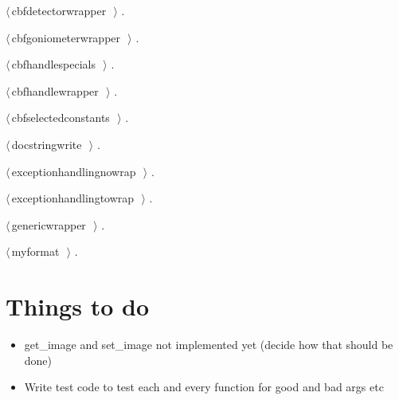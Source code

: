 \documentclass[10pt,a4paper,twoside,notitlepage]{article}
\begin{document}
{\small\begin{list}{}{\setlength{\itemsep}{-\parsep}\setlength{\itemindent}{-\leftmargin}}
\item $\langle\,$cbfdetectorwrapper\nobreak\ {\footnotesize {}}$\,\rangle$ {\footnotesize {\NWtxtRefIn} .}
\item $\langle\,$cbfgoniometerwrapper\nobreak\ {\footnotesize {}}$\,\rangle$ {\footnotesize {\NWtxtRefIn} .}
\item $\langle\,$cbfhandlespecials\nobreak\ {\footnotesize {}}$\,\rangle$ {\footnotesize {\NWtxtRefIn} .}
\item $\langle\,$cbfhandlewrapper\nobreak\ {\footnotesize {}}$\,\rangle$ {\footnotesize {\NWtxtRefIn} .}
\item $\langle\,$cbfselectedconstants\nobreak\ {\footnotesize {}}$\,\rangle$ {\footnotesize {\NWtxtRefIn} .}
\item $\langle\,$docstringwrite\nobreak\ {\footnotesize {}}$\,\rangle$ {\footnotesize {\NWtxtRefIn} .}
\item $\langle\,$exceptionhandlingnowrap\nobreak\ {\footnotesize {}}$\,\rangle$ {\footnotesize {\NWtxtRefIn} .}
\item $\langle\,$exceptionhandlingtowrap\nobreak\ {\footnotesize {}}$\,\rangle$ {\footnotesize {\NWtxtRefIn} .}
\item $\langle\,$genericwrapper\nobreak\ {\footnotesize {}}$\,\rangle$ {\footnotesize {\NWtxtRefIn} .}
\item $\langle\,$myformat\nobreak\ {\footnotesize {}}$\,\rangle$ {\footnotesize {\NWtxtRefIn} .}
\end{list}}

\section*{Things to do}

\begin{itemize}
\item get\_image and set\_image not implemented yet (decide how that should be done)
\item Write test code to test each and every function for good and bad args etc
\end{itemize}
\end{document}
